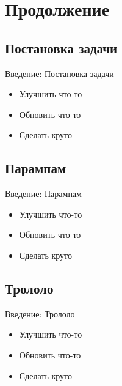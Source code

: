 \documentclass[11pt,pdf,hyperref={unicode}]{beamer}
\begin{document}


\section{Продолжение} %
\label{sec:continious}

	\subsection{Постановка задачи} %
	\label{sub:problem2}
		\begin{frame}{Введение: Постановка задачи} 
			\begin{itemize}
				\item Улучшить что-то
				\pause \item Обновить что-то
				\pause \item Сделать круто
			\end{itemize}
		\end{frame}

	\subsection{Парампам} %
	\label{sub:params2}
		\begin{frame}{Введение: Парампам}
			\begin{itemize}
				\item Улучшить что-то
				\pause \item Обновить что-то
				\pause \item Сделать круто
			\end{itemize}
		\end{frame}
	

	\subsection{Трололо} %
	\label{sub:trololo2}
		\begin{frame}{Введение: Трололо}
			\begin{itemize}
				\item Улучшить что-то
				\pause \item Обновить что-то
				\pause \item Сделать круто
			\end{itemize}
		\end{frame}

\end{document}
